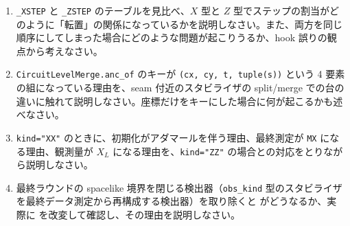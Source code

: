 \begin{exercise}
  \begin{enumerate}
    \item \texttt{\_XSTEP} と \texttt{\_ZSTEP} のテーブルを見比べ、$X$ 型と $Z$ 型でステップの割当がどのように「転置」の関係になっているかを説明しなさい。また、両方を同じ順序にしてしまった場合にどのような問題が起こりうるか、hook 誤りの観点から考えなさい。
    \item \texttt{CircuitLevelMerge.anc\_of} のキーが \texttt{(cx, cy, t, tuple(s))} という 4 要素の組になっている理由を、seam 付近のスタビライザの split/merge での台の違いに触れて説明しなさい。座標だけをキーにした場合に何が起こるかも述べなさい。
    \item \texttt{kind="XX"} のときに、初期化がアダマールを伴う理由、最終測定が \texttt{MX} になる理由、観測量が $X_L$ になる理由を、\texttt{kind="ZZ"} の場合との対応をとりながら説明しなさい。
    \item 最終ラウンドの spacelike 境界を閉じる検出器（\texttt{obs\_kind} 型のスタビライザを最終データ測定から再構成する検出器）を取り除くと  がどうなるか、実際に  を改変して確認し、その理由を説明しなさい。
  \end{enumerate}
\end{exercise}
